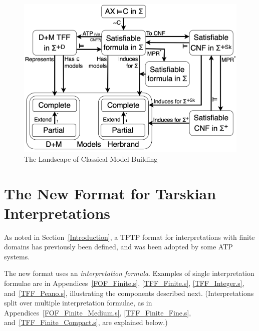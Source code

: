 \documentclass{easychair}
\begin{document}
\begin{figure}[htbp]
\includegraphics[width=\textwidth]{ModelLandscape.pdf}
\caption{The Landscape of Classical Model Building}
\label{ModelLandscape}
\end{figure}

\section{The New Format for Tarskian Interpretations}
\label{NewTarskian}

As noted in Section~\ref{Introduction}, a TPTP format for interpretations with finite domains 
has previously been defined, and was been adopted by some ATP systems.

The new format uses an {\em interpretation formula}. 
Examples of single interpretation formulae are in Appendices~\ref{FOF_Finite.s},
\ref{TFF_Finite.s}, \ref{TFF_Integer.s}, and~\ref{TFF_Peano.s}, illustrating the components 
described next. 
(Interpretations split over multiple interpretation formulae, as in 
Appendices~\ref{FOF_Finite_Medium.s}, \ref{TFF_Finite_Fine.s}, and~\ref{TFF_Finite_Compact.s},
are explained below.)
\end{document}
